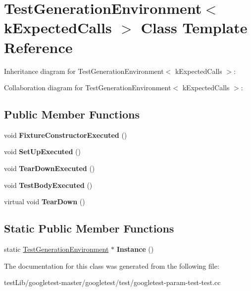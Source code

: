 \hypertarget{classTestGenerationEnvironment}{}\section{Test\+Generation\+Environment$<$ k\+Expected\+Calls $>$ Class Template Reference}
\label{classTestGenerationEnvironment}


Inheritance diagram for Test\+Generation\+Environment$<$ k\+Expected\+Calls $>$\+:


Collaboration diagram for Test\+Generation\+Environment$<$ k\+Expected\+Calls $>$\+:
\subsection*{Public Member Functions}
\begin{DoxyCompactItemize}
\item 
\mbox{\label{classTestGenerationEnvironment_abcdae77887fbd6dba18f4a55b80f058d}} 
void {\bfseries Fixture\+Constructor\+Executed} ()
\item 
\mbox{\label{classTestGenerationEnvironment_aa17c620af5eb9929bdbde25820cd8e28}} 
void {\bfseries Set\+Up\+Executed} ()
\item 
\mbox{\label{classTestGenerationEnvironment_a0d2576b10818bae1945e17e6e749ff9b}} 
void {\bfseries Tear\+Down\+Executed} ()
\item 
\mbox{\label{classTestGenerationEnvironment_a358a1d7cbefc3f9157f625f87dbde754}} 
void {\bfseries Test\+Body\+Executed} ()
\item 
\mbox{\label{classTestGenerationEnvironment_ac3787d8afb43b97b0b3d6dec78b04798}} 
virtual void {\bfseries Tear\+Down} ()
\end{DoxyCompactItemize}
\subsection*{Static Public Member Functions}
\begin{DoxyCompactItemize}
\item 
\mbox{\label{classTestGenerationEnvironment_a5b8e14f430fe11d558c0e4482cebd694}} 
static \hyperlink{classTestGenerationEnvironment}{Test\+Generation\+Environment} $\ast$ {\bfseries Instance} ()
\end{DoxyCompactItemize}


The documentation for this class was generated from the following file\+:\begin{DoxyCompactItemize}
\item 
test\+Lib/googletest-\/master/googletest/test/googletest-\/param-\/test-\/test.\+cc\end{DoxyCompactItemize}
